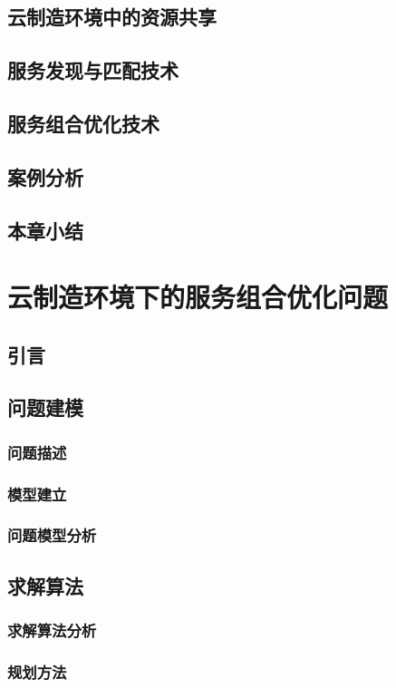 \documentclass[UTF8]{ctexart}
\begin{document}
	\subsection{云制造环境中的资源共享}
	\subsection{服务发现与匹配技术}
	\subsection{服务组合优化技术}
	\subsection{案例分析}
	\subsection{本章小结}

\newpage

\section{云制造环境下的服务组合优化问题}
	\subsection{引言}
	\subsection{问题建模}
		\subsubsection{问题描述}
		\subsubsection{模型建立}
		\subsubsection{问题模型分析}
	\subsection{求解算法}
		\subsubsection{求解算法分析}
		\subsubsection{规划方法}
\end{document}
